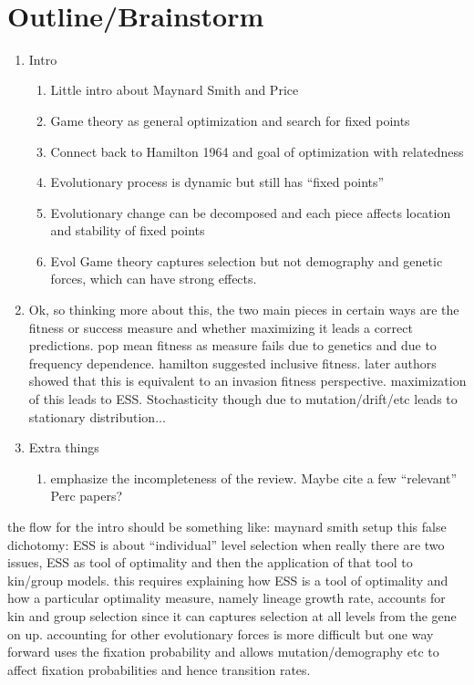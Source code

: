 \documentclass[11pt]{article}
\begin{document}
\vspace{3em}
\\

\newpage

\section{Outline/Brainstorm}

\begin{enumerate}
  \item Intro
        \begin{enumerate}
          \item Little intro about Maynard Smith and Price
          \item Game theory as general optimization and search for fixed points
          \item Connect back to Hamilton 1964 and goal of optimization with relatedness
          \item Evolutionary process is dynamic but still has ``fixed points''
          \item Evolutionary change can be decomposed and each piece affects location and stability of fixed points
          \item Evol Game theory captures selection but not demography and genetic forces, which can have strong effects.
        \end{enumerate}
  \item Ok, so thinking more about this, the two main pieces in certain ways are the fitness or success measure and whether maximizing it leads a correct predictions. pop mean fitness as measure fails due to genetics and due to frequency dependence. hamilton suggested inclusive fitness. later authors showed that this is equivalent to an invasion fitness perspective. maximization of this leads to ESS. Stochasticity though due to mutation/drift/etc leads to stationary distribution...
  \item Extra things
        \begin{enumerate}
          \item emphasize the incompleteness of the review. Maybe cite a few ``relevant'' Perc papers?
        \end{enumerate}
\end{enumerate}

the flow for the intro should be something like: maynard smith setup this false dichotomy: ESS is about ``individual'' level selection when really there are two issues, ESS as tool of optimality and then the application of that tool to kin/group models. this requires explaining how ESS is a tool of optimality and how a particular optimality measure, namely lineage growth rate, accounts for kin and group selection since it can captures selection at all levels from the gene on up. accounting for other evolutionary forces is more difficult but one way forward uses the fixation probability and allows mutation/demography etc to affect fixation probabilities and hence transition rates.
\end{document}
